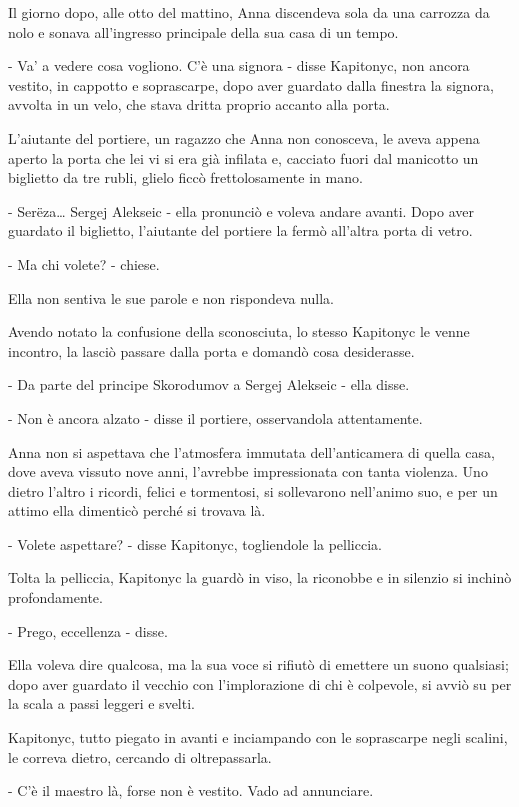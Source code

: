 Il giorno dopo, alle otto del mattino, Anna discendeva sola da una carrozza da nolo e sonava all'ingresso principale della sua casa di un tempo. 

- Va' a vedere cosa vogliono. C'è una signora - disse Kapitonyc, non ancora vestito, in cappotto e soprascarpe, dopo aver guardato dalla finestra la signora, avvolta in un velo, che stava dritta proprio accanto alla porta. 

L'aiutante del portiere, un ragazzo che Anna non conosceva, le aveva appena aperto la porta che lei vi si era già infilata e, cacciato fuori dal manicotto un biglietto da tre rubli, glielo ficcò frettolosamente in mano. 

- Serëza\ldots{} Sergej Alekseic - ella pronunciò e voleva andare avanti. Dopo aver guardato il biglietto, l'aiutante del portiere la fermò all'altra porta di vetro. 

- Ma chi volete? - chiese. 

Ella non sentiva le sue parole e non rispondeva nulla. 

Avendo notato la confusione della sconosciuta, lo stesso Kapitonyc le venne incontro, la lasciò passare dalla porta e domandò cosa desiderasse. 

- Da parte del principe Skorodumov a Sergej Alekseic - ella disse. 

- Non è ancora alzato - disse il portiere, osservandola attentamente. 

Anna non si aspettava che l'atmosfera immutata dell'anticamera di quella casa, dove aveva vissuto nove anni, l'avrebbe impressionata con tanta violenza. Uno dietro l'altro i ricordi, felici e tormentosi, si sollevarono nell'animo suo, e per un attimo ella dimenticò perché si trovava là. 

- Volete aspettare? - disse Kapitonyc, togliendole la pelliccia. 

Tolta la pelliccia, Kapitonyc la guardò in viso, la riconobbe e in silenzio si inchinò profondamente. 

- Prego, eccellenza - disse. 

Ella voleva dire qualcosa, ma la sua voce si rifiutò di emettere un suono qualsiasi; dopo aver guardato il vecchio con l'implorazione di chi è colpevole, si avviò su per la scala a passi leggeri e svelti. 

Kapitonyc, tutto piegato in avanti e inciampando con le soprascarpe negli scalini, le correva dietro, cercando di oltrepassarla. 

- C'è il maestro là, forse non è vestito. Vado ad annunciare. 

